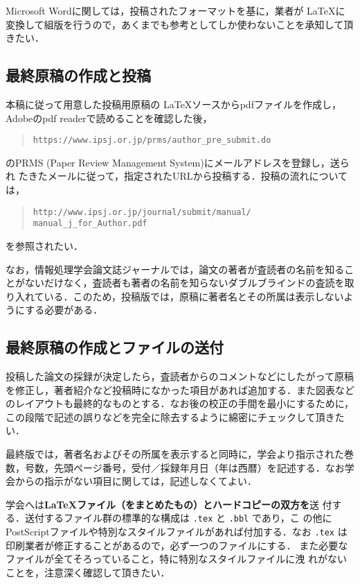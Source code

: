 \documentclass[submit,techrep]{ipsj}
\def\|{\verb|}
\begin{document}
Microsoft Wordに関しては，投稿されたフォーマットを基に，業者が \LaTeX に
変換して組版を行うので，あくまでも参考としてしか使わないことを承知して頂
きたい．

%2.2
\subsection{最終原稿の作成と投稿}

本稿に従って用意した投稿用原稿の \LaTeX ソースからpdfファイルを作成し，
Adobeのpdf readerで読めることを確認した後，
\begin{quote}
\small
\|https://www.ipsj.or.jp/prms/author_pre_submit.do|
\end{quote}
のPRMS (Paper Review Management System)にメールアドレスを登録し，送られ
たきたメールに従って，指定されたURLから投稿する．投稿の流れについては，
\begin{quote}
\small
\|http://www.ipsj.or.jp/journal/submit/manual/|
\|manual_j_for_Author.pdf|
\end{quote}
を参照されたい．

なお，情報処理学会論文誌ジャーナルでは，論文の著者が査読者の名前を知るこ
とがないだけなく，査読者も著者の名前を知らないダブルブラインドの査読を取
り入れている．このため，投稿版では，原稿に著者名とその所属は表示しないよ
うにする必要がある．

\subsection{最終原稿の作成とファイルの送付}

投稿した論文の採録が決定したら，査読者からのコメントなどにしたがって原稿
を修正し，著者紹介など投稿時になかった項目があれば追加する．また図表など
のレイアウトも最終的なものとする．なお後の校正の手間を最小にするために，
この段階で記述の誤りなどを完全に除去するように綿密にチェックして頂きたい．

最終版では，著者名およびその所属を表示すると同時に，学会より指示された巻
数，号数，先頭ページ番号，受付／採録年月日（年は西暦）を記述する．なお学
会からの指示がない項目に関しては，記述しなくてよい．

学会へは{\bf \LaTeX ファイル（をまとめたもの）とハードコピーの双方を}送
付する．送付するファイル群の標準的な構成は \|.tex| と \|.bbl| であり，こ
の他にPostScriptファイルや特別なスタイルファイルがあれば付加する．なお 
\|.tex| は印刷業者が修正することがあるので，{必ず一つのファイルにする}．
また必要なファイルが全てそろっていること，特に特別なスタイルファイルに洩
れがないことを，注意深く確認して頂きたい．
\end{document}
